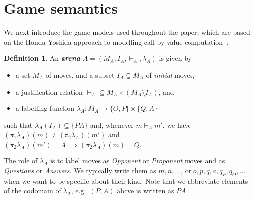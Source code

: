 \documentclass{CSML}
\theoremstyle{definition}\newtheorem{definition}[thm]{Definition}
\theoremstyle{definition}\newtheorem{example}[thm]{Example}
\theoremstyle{definition}\newtheorem{proposition}[thm]{Proposition}
\theoremstyle{definition}\newtheorem{lemma}[thm]{Lemma}
\theoremstyle{definition}\newtheorem{theorem}[thm]{Theorem}
\theoremstyle{definition}\newtheorem{corollary}[thm]{Corollary}
\theoremstyle{definition}\newtheorem{remark}[thm]{Remark}
\newcommand\nt[1]{#1}
\newcommand\arr{\rightarrow}
\newcommand\boldemph[1]{\emph{\textbf{#1}}}
\begin{document}
\section{Game semantics}


We next introduce the game models used throughout the paper,
which are based on the Honda-Yoshida approach to modelling call-by-value computation~\cite{HY97}.
\begin{definition}
An \boldemph{arena} $A=(M_A,I_A,\vdash_A,\lambda_A)$ is given by
\begin{itemize}\item a set $M_A$ of moves, and a subset $I_A\subseteq M_A$ of \emph{initial} moves,
  \item a justification relation ${\vdash_A}\subseteq M_A\times (M_A\setminus{I}_A)$, and
  \item a labelling function $\lambda_A:M_A\arr \{O,P\}\times\{Q,A\}$\,
\end{itemize}such that $\lambda_A(I_A)\subseteq\{\mathit{PA}\}$ and, whenever $m\vdash_A m'$,
we have $(\pi_1\lambda_A)(m)\neq(\pi_2\lambda_A)(m')$ and $(\pi_2\lambda_A)(m')=A\implies (\pi_2\lambda_A)(m)=Q$. 
\end{definition}
The role of $\lambda_A$ is to label moves as \emph{Opponent} or \emph{Proponent} moves and
as \emph{Questions} or \emph{Answers}. We typically write them as $m,n,\dots$, or $o,p,q,a,q_P,q_O,\dots$ when we want to be specific about their kind.
\nt{Note that we abbreviate elements of the codomain of $\lambda_A$, e.g.\ $(P,A)$ above is written as $PA$.}
\end{document}
